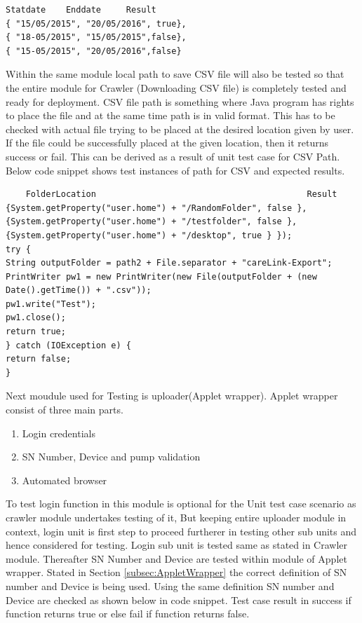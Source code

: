 \documentclass[article,type=msc,colorback,accentcolor=tud9c,twoside,11pt]{tudthesis}
\begin{document}
\begin{lstlisting}
Statdate 	Enddate 	Result
{ "15/05/2015", "20/05/2016", true},
{ "18-05/2015", "15/05/2015",false},
{ "15-05/2015", "20/05/2016",false}
\end{lstlisting}
 Within the same module local path to save CSV file will also be tested so that the entire module for Crawler (Downloading CSV file) is completely tested and ready for deployment. CSV file path is something where Java program has rights to place the file and at the same time path is in valid format. This has to be checked with actual file trying to be placed at the desired location given by user. If the file could be successfully placed at the given location, then it returns success or fail. This can be derived as a result of unit test case for CSV Path. Below code snippet shows test instances of path for CSV and expected results.
 \begin{lstlisting}
	FolderLocation											Result
{System.getProperty("user.home") + "/RandomFolder", false },
{System.getProperty("user.home") + "/testfolder", false },
{System.getProperty("user.home") + "/desktop", true } });
try {
String outputFolder = path2 + File.separator + "careLink-Export";
PrintWriter pw1 = new PrintWriter(new File(outputFolder + (new Date().getTime()) + ".csv"));
pw1.write("Test");
pw1.close();
return true;
} catch (IOException e) {
return false;
}
\end{lstlisting}
Next moudule used for Testing is uploader(Applet wrapper). Applet wrapper consist of three main parts.
 \begin{enumerate}
\item Login credentials
\item SN Number, Device and pump validation
\item Automated browser
\end{enumerate}
To test login function in this module is optional for the Unit test case scenario as crawler module undertakes testing of it, But keeping entire uploader module in context, login unit is first step to proceed furtherer in testing other sub units and hence considered for testing. Login sub unit is tested same as stated in Crawler module. Thereafter SN Number and Device are tested within module of Applet wrapper. Stated in Section \ref{subsec:AppletWrapper} the correct definition of SN number and Device is being used. Using the same definition SN number and Device are checked as shown below in code snippet. Test case result in success if function returns true or else fail if function returns false.
\end{document}

